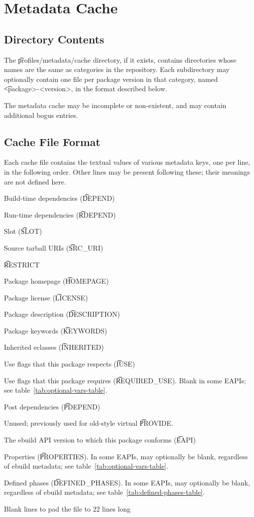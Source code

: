 \chapter{Metadata Cache}
\label{metadata-cache}

\section{Directory Contents}

The \t{profiles/metadata/cache} directory, if it exists, contains directories whose names are the
same as categories in the repository. Each subdirectory may optionally contain one file per package
version in that category, named \t{<package>-<version>}, in the format described below.

The metadata cache may be incomplete or non-existent, and may contain additional bogus entries.

\section{Cache File Format}

Each cache file contains the textual values of various metadata keys, one per line, in the following
order. Other lines may be present following these; their meanings are not defined here.

\begin{compactenum}
\item Build-time dependencies (\t{DEPEND})
\item Run-time dependencies (\t{RDEPEND})
\item Slot (\t{SLOT})
\item Source tarball URIs (\t{SRC\_URI})
\item \t{RESTRICT}
\item Package homepage (\t{HOMEPAGE})
\item Package license (\t{LICENSE})
\item Package description (\t{DESCRIPTION})
\item Package keywords (\t{KEYWORDS})
\item Inherited eclasses (\t{INHERITED})
\item Use flags that this package respects (\t{IUSE})
\item Use flags that this package requires (\t{REQUIRED\_USE}).
    Blank in some EAPIs; see table~\ref{tab:optional-vars-table}.
\item Post dependencies (\t{PDEPEND})
\item Unused; previously used for old-style virtual \t{PROVIDE}.
\item The ebuild API version to which this package conforms (\t{EAPI})
\item Properties (\t{PROPERTIES}). In some EAPIs, may optionally be blank, regardless of ebuild
    metadata; see table~\ref{tab:optional-vars-table}.
\item Defined phases (\t{DEFINED\_PHASES}). In some EAPIs, may optionally be blank, regardless of
    ebuild metadata; see table~\ref{tab:defined-phases-table}.
\item Blank lines to pad the file to 22 lines long
\end{compactenum}

